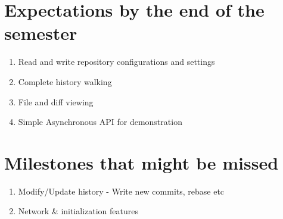 \section{Expectations by the end of the semester}

\begin{enumerate}

	\item Read and write repository configurations and settings
    \item Complete history walking
    \item File and diff viewing
    \item Simple Asynchronous API for demonstration

\end{enumerate}

\section{Milestones that  might be missed}


\begin{enumerate}

	\item Modify/Update history - Write new commits, rebase etc
    \item Network \& initialization features

\end{enumerate}
